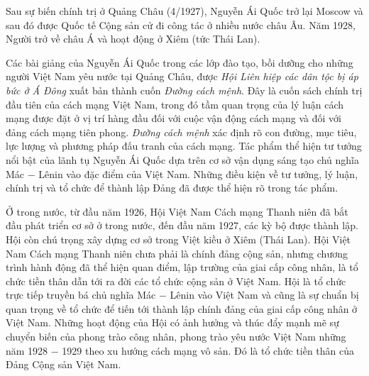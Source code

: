 Sau sự biến chính trị ở Quảng Châu (4/1927), Nguyễn Ái Quốc trở lại Moscow và sau đó được Quốc tế Cộng sản cử đi công tác ở nhiều nước châu Âu. Năm 1928, Người trở về châu Á và hoạt động ở Xiêm (tức Thái Lan).

Các bài giảng của Nguyễn Ái Quốc trong các lớp đào tạo, bồi dưỡng cho những người Việt Nam yêu nước tại Quảng Châu, được \textit{Hội Liên hiệp các dân tộc bị áp bức ở Á Đông} xuất bản thành cuốn \textit{Đường cách mệnh}. Đây là cuốn sách chính trị đầu tiên của cách mạng Việt Nam, trong đó tầm quan trọng của lý luận cách mạng được đặt ở vị trí hàng đầu đối với cuộc vận động cách mạng và đối với đảng cách mạng tiên phong. \textit{Đường cách mệnh} xác định rõ con đường, mục tiêu, lực lượng và phương pháp đấu tranh của cách mạng. Tác phẩm thể hiện tư tưởng nổi bật của lãnh tụ Nguyễn Ái Quốc dựa trên cơ sở vận dụng sáng tạo chủ nghĩa Mác $-$ Lênin vào đặc điểm của Việt Nam. Những điều kiện về tư tưởng, lý luận, chính trị và tổ chức để thành lập Đảng đã được thể hiện rõ trong tác phẩm.

Ở trong nước, từ đầu năm 1926, Hội Việt Nam Cách mạng Thanh niên đã bắt đầu phát triển cơ sở ở trong nước, đến đầu năm 1927, các kỳ bộ được thành lập. Hội còn chú trọng xây dựng cơ sở trong Việt kiều ở Xiêm (Thái Lan). Hội Việt Nam Cách mạng Thanh niên chưa phải là chính đảng cộng sản, nhưng chương trình hành động đã thể hiện quan điểm, lập trường của giai cấp công nhân, là tổ chức tiền thân dẫn tới ra đời các tổ chức cộng sản ở Việt Nam. Hội là tổ chức trực tiếp truyền bá chủ nghĩa Mác $-$ Lênin vào Việt Nam và cũng là sự chuẩn bị quan trọng về tổ chức để tiến tới thành lập chính đảng của giai cấp công nhân ở Việt Nam. Những hoạt động của Hội có ảnh hưởng và thúc đẩy mạnh mẽ sự chuyển biến của phong trào công nhân, phong trào yêu nước Việt Nam những năm 1928 $-$ 1929 theo xu hướng cách mạng vô sản. Đó là tổ chức tiền thân của Đảng Cộng sản Việt Nam.